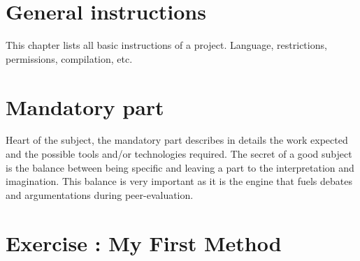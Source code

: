 \documentclass{42-en}
\begin{document}
\chapter{General instructions}

    This chapter lists all basic instructions of a project.
    Language, restrictions, permissions, compilation, etc.



\chapter{Mandatory part}

    Heart of the subject, the mandatory part describes in details the
    work expected and the possible tools and/or technologies
    required. The secret of a good subject is the balance between
    being specific and leaving a part to the interpretation and
    imagination. This balance is very important as it is the engine
    that fuels debates and argumentations during peer-evaluation.



\chapter{Exercise \exercicenumber: My First Method}

\exnumber{\exercicenumber}

\makeheaderfiles

\end{document}
